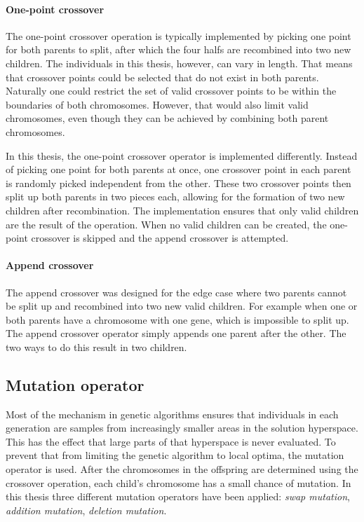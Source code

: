 \paragraph{One-point crossover} The one-point crossover operation is typically
implemented by picking one point for both parents to split, after which the
four halfs are recombined into two new children. The individuals in this
thesis, however, can vary in length. That means that crossover points could be
selected that do not exist in both parents. Naturally one could restrict the
set of valid crossover points to be within the boundaries of both chromosomes.
However, that would also limit valid chromosomes, even though they can be
achieved by combining both parent chromosomes.

In this thesis, the one-point crossover operator is implemented differently.
Instead of picking one point for both parents at once, one crossover point in
each parent is randomly picked independent from the other. These two crossover
points then split up both parents in two pieces each, allowing for the
formation of two new children after recombination. The implementation ensures
that only valid children are the result of the operation. When no valid
children can be created, the one-point crossover is skipped and the append
crossover is attempted.

\paragraph{Append crossover} The append crossover was designed for the edge
case where two parents cannot be split up and recombined into two new valid
children. For example when one or both parents have a chromosome with one gene,
which is impossible to split up. The append crossover operator simply appends
one parent after the other. The two ways to do this result in two children.

\subsection{Mutation operator}
\label{sec:approach_mutation_operator}
Most of the mechanism in genetic algorithms ensures that individuals in each
generation are samples from increasingly smaller areas in the solution
hyperspace. This has the effect that large parts of that hyperspace is never
evaluated. To prevent that from limiting the genetic algorithm to local optima,
the mutation operator is used. After the chromosomes in the offspring are
determined using the crossover operation, each child's chromosome has a small
chance of mutation. In this thesis three different mutation operators have been
applied: \emph{swap mutation}, \emph{addition mutation}, \emph{deletion mutation}.

